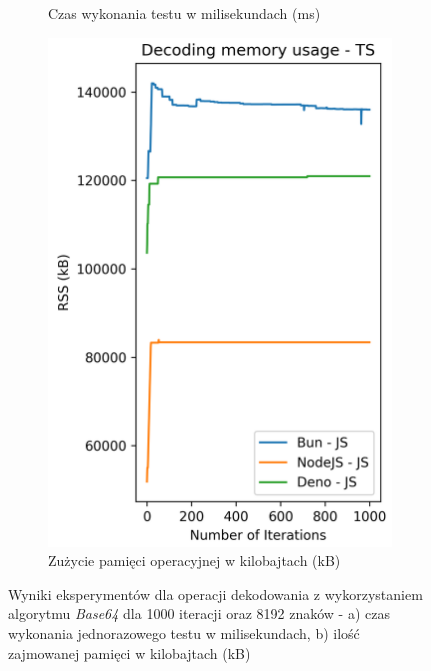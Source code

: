 \begin{figure}[H]
\begin{subfigure}[b]{0.44\textwidth}
    \caption{Czas wykonania testu w milisekundach (ms)}
    \label{fig:decoding_e2_js_time}
  \end{subfigure}
  \begin{subfigure}[b]{0.44\textwidth}
    \centering
    \includegraphics[width=\textwidth]{Figures/coding/base64_1000_decoding_js_memory.png}
    \caption{Zużycie pamięci operacyjnej w kilobajtach (kB)}
    \label{fig:decoding_e2_js_memory}
  \end{subfigure}
  \hfill
  \caption{Wyniki eksperymentów dla operacji dekodowania z wykorzystaniem algorytmu \textit{Base64} dla 1000 iteracji oraz 8192 znaków - a) czas wykonania jednorazowego testu w milisekundach, b) ilość zajmowanej pamięci w kilobajtach (kB)}
  \label{fig:decoding_e2_js}
\end{figure}

